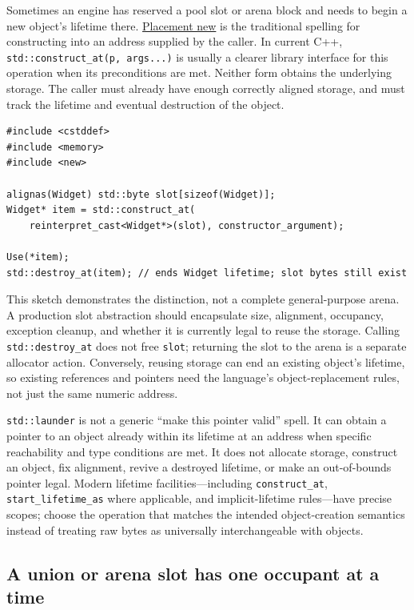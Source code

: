 Sometimes an engine has reserved a pool slot or arena block and needs to begin a new object's lifetime there. \hyperref[appendix-f56c3e43fd4e]{Placement new} is the traditional spelling for constructing into an address supplied by the caller. In current C++, \texttt{std::construct\_at(p,\ args...)} is usually a clearer library interface for this operation when its preconditions are met. Neither form obtains the underlying storage. The caller must already have enough correctly aligned storage, and must track the lifetime and eventual destruction of the object.

\begin{verbatim}
#include <cstddef>
#include <memory>
#include <new>

alignas(Widget) std::byte slot[sizeof(Widget)];
Widget* item = std::construct_at(
    reinterpret_cast<Widget*>(slot), constructor_argument);

Use(*item);
std::destroy_at(item); // ends Widget lifetime; slot bytes still exist
\end{verbatim}

This sketch demonstrates the distinction, not a complete general-purpose arena. A production slot abstraction should encapsulate size, alignment, occupancy, exception cleanup, and whether it is currently legal to reuse the storage. Calling \texttt{std::destroy\_at} does not free \texttt{slot}; returning the slot to the arena is a separate allocator action. Conversely, reusing storage can end an existing object's lifetime, so existing references and pointers need the language's object-replacement rules, not just the same numeric address.

\texttt{std::launder} is not a generic ``make this pointer valid'' spell. It can obtain a pointer to an object already within its lifetime at an address when specific reachability and type conditions are met. It does not allocate storage, construct an object, fix alignment, revive a destroyed lifetime, or make an out-of-bounds pointer legal. Modern lifetime facilities---including \texttt{construct\_at}, \texttt{start\_lifetime\_as} where applicable, and implicit-lifetime rules---have precise scopes; choose the operation that matches the intended object-creation semantics instead of treating raw bytes as universally interchangeable with objects.

\subsection{A union or arena slot has one occupant at a time}\label{05-engine-i-ch004-a-union-or-arena-slot-has-one-occupant-at-a-time}

